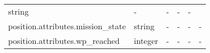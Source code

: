\documentclass[
]{article}
\begin{document}
\begin{longtable}[]{@{}llllll@{}}
\begin{minipage}[t]{0.14\columnwidth}
string\strut
\end{minipage} & \begin{minipage}[t]{0.14\columnwidth}\raggedright
-\strut
\end{minipage} & \begin{minipage}[t]{0.14\columnwidth}\raggedright
-\strut
\end{minipage} & \begin{minipage}[t]{0.14\columnwidth}\raggedright
-\strut
\end{minipage} & \begin{minipage}[t]{0.14\columnwidth}\raggedright
-\strut
\end{minipage}\tabularnewline
\begin{minipage}[t]{0.14\columnwidth}\raggedright
position.attributes.mission\_state\strut
\end{minipage} & \begin{minipage}[t]{0.14\columnwidth}\raggedright
string\strut
\end{minipage} & \begin{minipage}[t]{0.14\columnwidth}\raggedright
-\strut
\end{minipage} & \begin{minipage}[t]{0.14\columnwidth}\raggedright
-\strut
\end{minipage} & \begin{minipage}[t]{0.14\columnwidth}\raggedright
-\strut
\end{minipage} & \begin{minipage}[t]{0.14\columnwidth}\raggedright
-\strut
\end{minipage}\tabularnewline
\begin{minipage}[t]{0.14\columnwidth}\raggedright
position.attributes.wp\_reached\strut
\end{minipage} & \begin{minipage}[t]{0.14\columnwidth}\raggedright
integer\strut
\end{minipage} & \begin{minipage}[t]{0.14\columnwidth}\raggedright
-\strut
\end{minipage} & \begin{minipage}[t]{0.14\columnwidth}\raggedright
-\strut
\end{minipage} & \begin{minipage}[t]{0.14\columnwidth}\raggedright
-\strut
\end{minipage} & \begin{minipage}[t]{0.14\columnwidth}\raggedright
-\strut
\end{minipage}\tabularnewline

\end{longtable}
\end{document}
